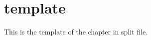 \documentclass{standalone}
\begin{document}
	
\chapter{template}
This is the template of the chapter in split file.
\end{document}
